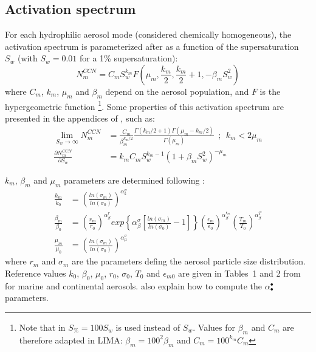 \subsection{Activation spectrum}

For each hydrophilic aerosol mode (considered chemically homogeneous), the activation spectrum is parameterized after \citet{Cohard1998} as a function of the supersaturation $S_w$  (with $S_w=0.01$ for a 1\% supersaturation):
\begin{equation}
\label{SpectreCPB98}
 N_m^{CCN} = C_m S_w^{k_m} F(\mu_m,\frac{k_m}{2},\frac{k_m}{2}+1,-\beta_m S_w^2)
\end{equation}
where $C_m$, $k_m$, $\mu_m$ and $\beta_m$ depend on the aerosol population, and $F$ is the hypergeometric function \citep{Gradshteyn1965}\footnote{Note that in \citet{Cohard1998} $S_\%=100 S_w$ is used instead of $S_w$. Values for $\beta_m$ and $C_m$ are therefore adapted in LIMA: $\beta_m = 100^2 \beta_m$ and $C_m = 100^{k_m} C_m$}. Some properties of this activation spectrum are presented in the appendices of \citet{Cohard2000spectre}, such as:
\begin{align}
  \label{limiteCCN}
 \lim_{S_w \to \infty} N_m^{CCN} &= \frac{C_m}{\beta_m^{k_m/2}}\frac{\Gamma(k_m/2+1)\Gamma(\mu_m-k_m/2)}{\Gamma(\mu_m)} ~~;~~ k_m<2\mu_m \\
 \frac{\partial N_m^{CCN}}{\partial S_w} &= k_m C_m S_w^{k_m-1} (1+\beta_m S_w^2)^{-\mu_m}
\end{align}

$k_m$, $\beta_m$ and $\mu_m$ parameters are determined following \citet{Cohard2000spectre}:
\begin{align}
 \frac{k_m}{k_0} &= \left(\frac{ln(\sigma_m)}{ln(\sigma_0)}\right)^{\alpha_k^\sigma} \\
% 
 \frac{\beta_m}{\beta_0} &= \left(\frac{r_m}{r_0}\right)^{\alpha_\beta^r}  exp\left\{\alpha_\beta^\sigma \left[\frac{ln(\sigma_m)}{ln(\sigma_0)}-1\right]\right\}  \left(\frac{\epsilon_m}{\epsilon_{0}}\right)^{\alpha_\beta^{\epsilon_m}}  \left(\frac{T_m}{T_0}\right)^{\alpha_\beta^T} \\
% 
 \frac{\mu_m}{\mu_0} &= \left(\frac{ln(\sigma_m)}{ln(\sigma_0)}\right)^{\alpha_\mu^\sigma}
\end{align}
where $r_m$ and $\sigma_m$ are the parameters defing the aerosol particle size distribution. Reference values $k_0$, $\beta_0$, $\mu_0$, $r_0$, $\sigma_0$, $T_0$ and $\epsilon_{m0}$ are given in Tables~1 and 2 from \citet{Cohard2000spectre} for marine and continental aerosols. \citet{Cohard2000spectre} also explain how to compute the $\alpha_\bullet^\bullet$ parameters.

